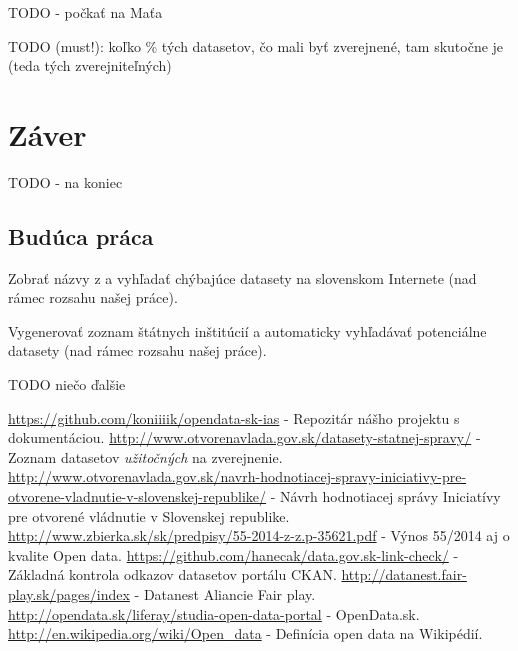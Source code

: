 \documentclass[12pt,a4paper]{article}
\begin{document}
TODO - počkať na Maťa 


TODO (must!): koľko \% tých datasetov, čo mali byť zverejnené, tam skutočne je (teda tých zverejniteľných)


\section{Záver} 

TODO - na koniec 

\subsection{Budúca práca} 
\label{future-work}

Zobrať názvy z \cite{525} a vyhľadať chýbajúce datasety na slovenskom Internete (nad rámec rozsahu našej práce). 

Vygenerovať zoznam štátnych inštitúcií a automaticky vyhľadávať potenciálne datasety (nad rámec rozsahu našej práce).

TODO niečo ďalšie 


\renewcommand{\refname}{Literatúra}
{}
\begin{thebibliography}{99}
   \url{https://github.com/koniiiik/opendata-sk-ias} - Repozitár nášho projektu s dokumentáciou. %
   \url{http://www.otvorenavlada.gov.sk/datasety-statnej-spravy/} - Zoznam datasetov \emph{užitočných} na zverejnenie.
   \url{http://www.otvorenavlada.gov.sk/navrh-hodnotiacej-spravy-iniciativy-pre-otvorene-vladnutie-v-slovenskej-republike/} - Návrh hodnotiacej správy Iniciatívy pre otvorené vládnutie v Slovenskej republike.
   \url{http://www.zbierka.sk/sk/predpisy/55-2014-z-z.p-35621.pdf} - Výnos 55/2014 aj o kvalite Open data. 
   \url{https://github.com/hanecak/data.gov.sk-link-check/} - Základná kontrola odkazov datasetov portálu CKAN. 
   \url{http://datanest.fair-play.sk/pages/index} - Datanest Aliancie Fair play. 
   \url{http://opendata.sk/liferay/studia-open-data-portal} - OpenData.sk. 
   \url{http://en.wikipedia.org/wiki/Open_data} - Definícia open data na Wikipédií. 
\end{thebibliography}
\end{document}
